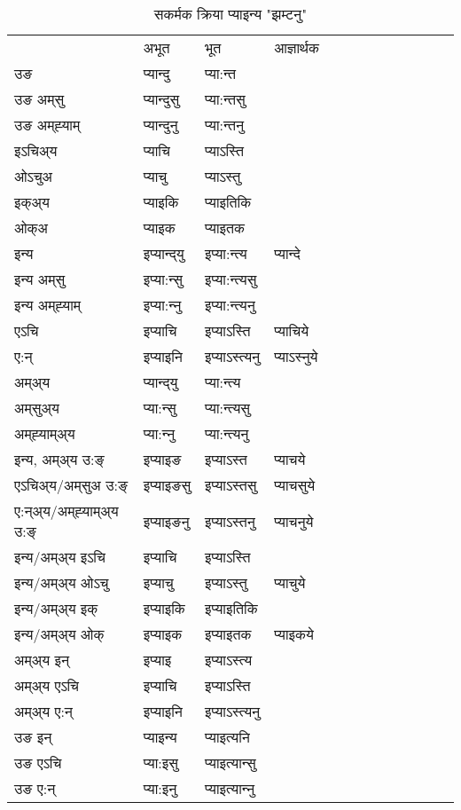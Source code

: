 \begin{table}[H]
\centering
\caption{\label{ɛnt.vt} सकर्मक क्रिया  प्याइन्य  "झम्टनु"  }
\begin{tabular}{l|l|l|l|l|l|l|l|l|l|l|l|l}  \toprule
&अभूत & भूत & आज्ञार्थक \\ 
उङ &प्यान्दु &प्या:न्त \\ 
उङ अम्‌सु&प्यान्दुसु &प्या:न्तसु \\ 
उङ अम्‌ह्‍याम्&प्यान्दुनु &प्या:न्तनु \\ 
इऽचिअ्य &प्याचि &प्याऽस्ति   \\ 
ओऽचुअ        &प्याचु &प्याऽस्तु   \\ 
इक्अ्य&प्याइकि &प्याइतिकि   \\ 
ओक्अ &प्याइक &प्याइतक   \\ 
इन्य & इप्यान्द्‌यु  & इप्या:न्त्य &प्यान्दे  \\ 
इन्य अम्‌सु& इप्या:न्सु  & इप्या:न्त्यसु   \\ 
इन्य अम्‌ह्‍याम्& इप्या:न्‍नु  & इप्या:न्त्यनु   \\ 
एऽचि & इप्याचि & इप्याऽस्ति &प्याचिये    \\ 
ए:न् & इप्याइनि  & इप्याऽस्त्यनु &प्याऽस्‍नुये  \\ 
अम्अ्य & प्यान्द्‌यु  & प्या:न्त्य  \\ 
अम्‌सुअ्य & प्या:न्सु & प्या:न्त्यसु  \\ 
अम्‌ह्‍याम्अ्य & प्या:न्‍नु  & प्या:न्त्यनु \\ 
\midrule
इन्य, अम्अ्य उ:ङ्‌ &इप्याइङ &इप्याऽस्त &प्याचये \\ 
एऽचिअ्य/अम्‌सुअ उ:ङ्‌ &इप्याइङसु &इप्याऽस्तसु &प्याचसुये \\ 
ए:न्अ्य/अम्‌ह्‍याम्अ्य उ:ङ्‌ &इप्याइङनु &इप्याऽस्तनु &प्याचनुये \\ 
इन्य/अम्अ्य इऽचि &इप्याचि &इप्याऽस्ति    \\ 
इन्य/अम्अ्य ओऽचु &इप्याचु &इप्याऽस्तु  &प्याचुये  \\ 
इन्य/अम्अ्य इक् &इप्याइकि &इप्याइतिकि   \\ 
इन्य/अम्अ्य ओक् &इप्याइक &इप्याइतक  &प्याइकये  \\ 
अम्अ्य इन् & इप्याइ & इप्याऽस्त्य   \\ 
अम्अ्य एऽचि & इप्याचि & इप्याऽस्ति    \\ 
अम्अ्य ए:न् & इप्याइनि  & इप्याऽस्त्यनु  \\ 
\midrule
उङ इन् & प्याइन्य  & प्याइत्यनि  \\ 
उङ एऽचि & प्या:इसु  & प्याइत्यान्सु   \\ 
उङ ए:न्& प्या:इनु  & प्याइत्यान्‍नु   \\ 
\bottomrule
\end{tabular}
\end{table}


